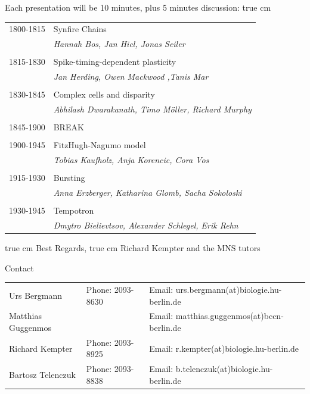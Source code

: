 \documentclass[12pt]{article}
\begin{document}
Each presentation will be 10 minutes, plus 5 minutes discussion:
 true cm
\begin{tabular}{ll}
 1800-1815 \hspace{0.5cm} & Synfire Chains \\
                          & \textit{Hannah Bos, Jan Hicl, Jonas Seiler} \\
 & \\
 1815-1830                & Spike-timing-dependent plasticity \\
                          & \textit{Jan Herding, Owen Mackwood ,Tanis Mar} \\
 & \\
 1830-1845                & Complex cells and disparity \\
                          & \textit{Abhilash Dwarakanath, Timo M\"oller,
Richard Murphy} \\
 & \\
 1845-1900                & BREAK \\
 & \\
 1900-1945                & FitzHugh-Nagumo model \\
                          & \textit{Tobias Kaufholz, Anja Korencic, Cora Vos}
\\
 & \\
 1915-1930                 & Bursting \\
                          & \textit{Anna Erzberger, Katharina Glomb, Sacha
Sokoloski} \\
 & \\
 1930-1945                & Tempotron \\
                          & \textit{Dmytro
Bielievtsov, Alexander Schlegel, Erik Rehn}
\end{tabular}
 true cm
Best Regards,
 true cm
Richard Kempter and the MNS tutors

\vfill
\centerline{\CAP Contact}
\CAP

\begin{tabular}{lll}
Urs Bergmann & Phone: 2093-8630 & Email:
urs.bergmann(at)biologie.hu-berlin.de \\
Matthias Guggenmos & & Email: matthias.guggenmos(at)bccn-berlin.de \\
Richard Kempter \hfill & Phone: 2093-8925 \hfill & Email:
r.kempter(at)biologie.hu-berlin.de \\
Bartosz Telenczuk & Phone: 2093-8838 & Email:
b.telenczuk(at)biologie.hu-berlin.de \\
\end{tabular}
\end{document}
